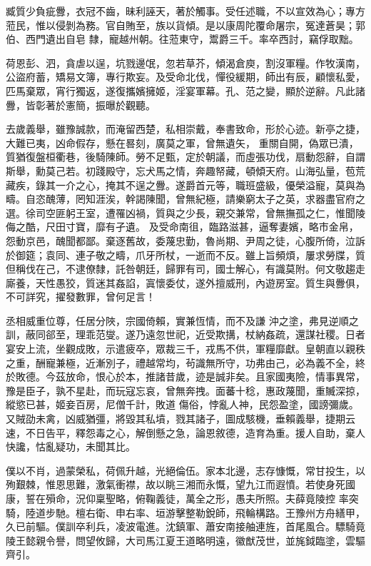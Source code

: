 \begin{pinyinscope}
 臧質少負疵釁，衣冠不齒，昧利誣天，著於觸事。受任述職，不以宣效為心；專方蒞民，惟以侵剝為務。官自賄至，族以貨傾。是以康周陀覆命屠宗，冤達蒼昊；郭伯、西門遺出自皂
 隸，寵越州朝。往蒞東守，鬻爵三千。率卒西討，竊俘取黜。



 荷恩彭、泗，貪虐以逞，坑戮邊氓，忽若草芥，傾渴倉庾，割沒軍糧。作牧漢南，公盜府蓄，矯易文簿，專行欺妄。及受命北伐，憚役緩期，師出有辰，顧懷私愛，匹馬棄眾，宵行獨返，遂復攜嬪擁姬，淫宴軍幕。孔、范之變，顯於逆辭。凡此諸釁，皆彰著於憲簡，振曝於觀聽。



 去歲義舉，雖豫誠款，而淹留西楚，私相崇戴，奉書致命，形於心迹。新亭之捷，大難已夷，凶命假存，懸在晷刻，廣莫之軍，曾無遺矢，
 重關自開，偽眾已潰，質猶復盤桓衢巷，後騎陳師。勞不足甄，定於朝議，而虛張功伐，扇動怨辭，自謂斯舉，勳莫己若。初踐殿守，忘犬馬之情，奔趣帑藏，頓傾天府。山海弘量，苞荒藏疾，錄其一介之心，掩其不逞之釁。遂爵首元等，職班盛級，優榮溢寵，莫與為疇。自恣醜薄，罔知涯涘，幹謁陳聞，曾無紀極，請樂窮太子之英，求器盡官府之選。徐司空匪躬王室，遭罹凶禍，質與之少長，親交兼常，曾無撫孤之仁，惟聞陵侮之酷，尺田寸寶，靡有孑遺。
 及受命南徂，臨路滋甚，逼奪妻嬪，略市金帛，怨動京邑，醜聞都鄙。棄逐舊故，委蔑忠勤，魯尚期、尹周之徒，心腹所倚，泣訴於御筵；袁同、連子敬之疇，爪牙所杖，一逝而不反。雖上旨頻煩，屢求勞牒，質但稱伐在己，不逮僚隸，託咎朝廷，歸罪有司，國士解心，有識莫附。何文敬趨走廝養，天性愚狡，質迷其姦諂，寘懷委仗，遂外擅威刑，內遊房室。質生與釁俱，不可詳究，擢發數罪，曾何足言！



 丞相威重位尊，任居分陜，宗國倚賴，實兼恆情，而不及謙
 沖之塗，弗見逆順之訓，蔽同郤至，理乖范燮。遂乃遠忽世祀，近受欺搆，杖納姦疏，還謀社稷。日者宴安上流，坐觀成敗，示遣疲卒，眾裁三千，戎馬不供，軍糧靡獻。皇朝直以親秩之重，酬寵兼極，近漸別子，禮越常均，茍識無所守，功弗由己，必為義不全，終於敗德。今茲放命，恨心於本，推諸昔歲，迹是誠非矣。且家國夷險，情事異常，豫是臣子，孰不星赴，而玩寇忘哀，曾無奔拽。面蕃十稔，惠政蔑聞，重贓深掠，縱慾已甚，姬妾百房，尼僧千計，敗道
 傷俗，悖亂人神，民怨盈塗，國謗彌歲。又賊劭未禽，凶威猶彊，將毀其私墳，戮其諸子，圖成駭機，垂賴義舉，捷期云速，不日告平，釋怨毒之心，解倒懸之急，論恩敘德，造育為重。援人自助，棄人快讒，怙亂疑功，未聞其比。



 僕以不肖，過蒙榮私，荷佩升越，光絕倫伍。家本北邊，志存慷慨，常甘投生，以殉艱棘，惟恩思難，激氣衝襟，故以眺三湘而永慨，望九江而遐憤。若使身死國康，誓在殞命，況仰稟聖略，俯鞠義徒，萬全之形，愚夫所照。夫薛竟陵控
 率突騎，陸道步馳。檀右衛、申右率、垣游擊整勒銳師，飛輪構路。王豫州方舟繕甲，久已前驅。僕訓卒利兵，凌波電進。沈鎮軍、蕭安南接舳連旌，首尾風合。驃騎竟陵王懿親令譽，問望攸歸，大司馬江夏王道略明遠，徽猷茂世，並旄鉞臨塗，雲驅齊引。




\end{pinyinscope}
